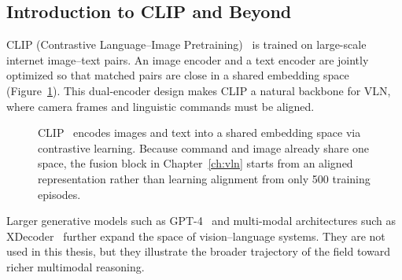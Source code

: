 \subsection{Introduction to CLIP and Beyond}

CLIP (Contrastive Language--Image Pretraining)~\cite{radford2021learning} is trained on large-scale internet image--text pairs. An image encoder and a text encoder are jointly optimized so that matched pairs are close in a shared embedding space (Figure~\ref{fig:clip_schematic}). This dual-encoder design makes CLIP a natural backbone for VLN, where camera frames and linguistic commands must be aligned.

\begin{figure}[ht]
    \centering
    \caption[CLIP shared embedding space]{CLIP~\cite{radford2021learning} encodes images and text into a shared embedding space via contrastive learning. Because command and image already share one space, the fusion block in Chapter~\ref{ch:vln} starts from an aligned representation rather than learning alignment from only 500 training episodes.}
    \label{fig:clip_schematic}
\end{figure}

Larger generative models such as GPT-4~\cite{openai2023gpt4} and multi-modal architectures such as XDecoder~\cite{zou2023generalized} further expand the space of vision--language systems. They are not used in this thesis, but they illustrate the broader trajectory of the field toward richer multimodal reasoning.

